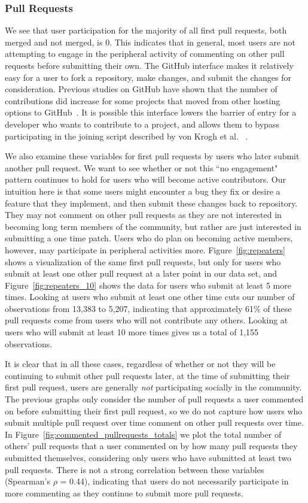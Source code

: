 \documentclass{sigchi}
\begin{document}
\subsubsection{Pull Requests}

We see that user participation for the majority of all first pull requests, both
merged and not merged, is 0. This indicates that in general, most users are not
attempting to engage in the peripheral activity of commenting on other pull
requests before submitting their own. The GitHub interface makes it relatively
easy for a user to fork a repository, make changes, and submit the changes for
consideration. Previous studies on GitHub have shown that the number of
contributions did increase for some projects that moved from other hosting
options to GitHub~\cite{mcdonald_performance_2013}. It is possible this
interface lowers the barrier of entry for a developer who wants to contribute to
a project, and allows them to bypass participating in the joining script
described by von Krogh et al. ~\cite{von_krogh_community_2003}.

We also examine these variables for first pull requests by users who later
submit another pull request. We want to see whether or not this ``no engagement"
pattern continues to hold for users who will become active contributors. Our
intuition here is that some users might encounter a bug they fix or desire a
feature that they implement, and then submit these changes back to repository.
They may not comment on other pull requests as they are not interested in
becoming long term members of the community, but rather are just interested in
submitting a one time patch. Users who do plan on becoming active members,
however, may participate in peripheral activities more.
Figure~\ref{fig:repeaters} shows a visualization of the same first pull
requests, but only for users who submit at least one other pull request at a
later point in our data set, and Figure~\ref{fig:repeaters_10} shows the data
for users who submit at least 5 more times. Looking at users who submit at least
one other time cuts our number of observations from 13,383 to 5,207, indicating
that approximately 61\% of these pull requests come from users who will not
contribute any others. Looking at users who will submit at least 10 more times
gives us a total of 1,155 observations.

It is clear that in all these cases, regardless of whether or not they will be
continuing to submit other pull requests later, at the time of submitting their
first pull request, users are generally \textit{not} participating socially in the community. The
previous graphs only consider the number of pull requests a user commented on
before submitting their first pull request, so we do not capture how users who
submit multiple pull request over time comment on other pull requests over time.
In Figure~\ref{fig:commented_pullrequests_totals} we plot the total number of
others' pull requests that a user commented on by how many pull requests they
submitted themselves, considering only users who have submitted at least two
pull requests. There is not a strong correlation between these variables
(Spearman's $\rho$  = 0.44), indicating that users do not necessarily
participate in more commenting as they continue to submit more pull requests.
\end{document}
